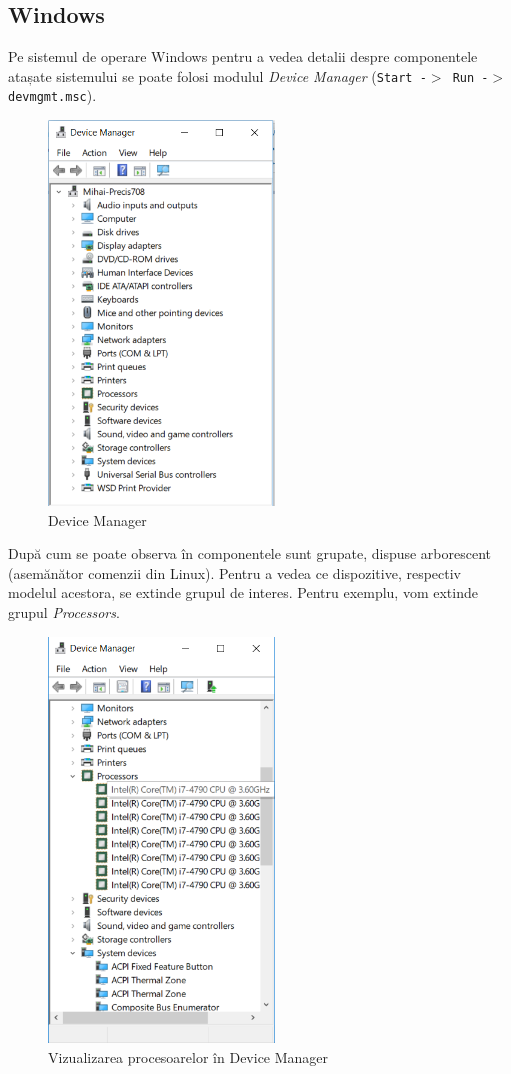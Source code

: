 \subsection{Windows}
\label{sec:hardware-virtualizare-windows}

Pe sistemul de operare Windows pentru a vedea detalii despre componentele
atașate sistemului se poate folosi modulul \textit{Device Manager} (\texttt{Start -$>$ Run
-$>$ devmgmt.msc}).

\begin{figure}[!htbp]
	\centering
	\includegraphics[width=6cm]{chapters/08-hw/img/devmanager-img.png}
	\caption{Device Manager}
	\label{fig:hw-devmanager}
\end{figure}

După cum se poate observa în 
componentele sunt grupate, dispuse arborescent (asemănător comenzii 
din Linux). Pentru a vedea ce dispozitive, respectiv modelul acestora, se
extinde grupul de interes. Pentru exemplu, vom extinde grupul
\textit{Processors}.

\begin{figure}[!htbp]
	\centering
	\includegraphics[width=6cm]{chapters/08-hw/img/devmanager-virt-img.png}
	\caption{Vizualizarea procesoarelor în Device Manager}
	\label{fig:hw-devmanager-virt}
\end{figure}


